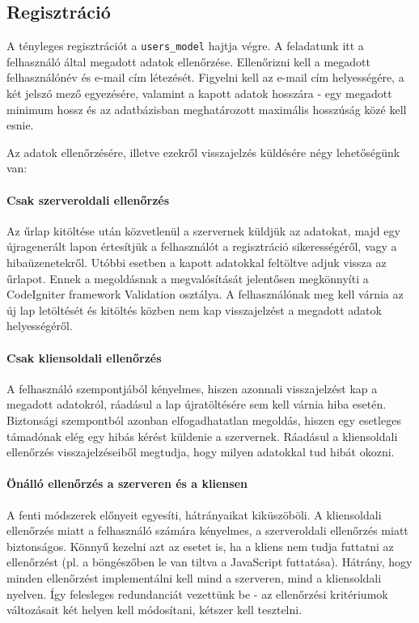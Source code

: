 \documentclass[12pt,a4paper,twoside]{article}
\begin{document}
\subsection{Regisztráció}
\label{sec:reg_check}

A tényleges regisztrációt a \texttt{users\_model} hajtja végre. A feladatunk itt
a felhasználó által megadott adatok ellenőrzése. Ellenőrizni
kell a megadott felhasználónév és e-mail cím létezését. Figyelni kell az e-mail
cím helyességére, a két jelszó mező egyezésére, valamint a kapott adatok
hosszára - egy megadott minimum hossz és az adatbázisban meghatározott
maximális hosszúság közé kell esnie.

Az adatok ellenőrzésére, illetve ezekről visszajelzés küldésére négy
lehetőségünk van:

\paragraph{Csak szerveroldali ellenőrzés}
Az űrlap kitöltése után közvetlenül a szervernek küldjük az adatokat, majd egy
újragenerált lapon értesítjük a felhasználót a regisztráció sikerességéről, vagy
a hibaüzenetekről. Utóbbi esetben a kapott adatokkal feltöltve adjuk vissza az
űrlapot. Ennek a megoldásnak a megvalósítását jelentősen megkönnyíti a
CodeIgniter framework Validation osztálya\cite{CI-Val}. A felhasználónak meg kell várnia az új lap
letöltését és kitöltés közben nem kap visszajelzést a megadott adatok
helyességéről.

\paragraph{Csak kliensoldali ellenőrzés}
A felhasználó szempontjából kényelmes, hiszen azonnali visszajelzést kap a
megadott adatokról, ráadásul a lap újratöltésére sem kell várnia hiba
esetén. Biztonsági szempontból azonban elfogadhatatlan megoldás, hiszen egy
esetleges támadónak elég egy hibás kérést küldenie a szervernek. Ráadásul a
kliensoldali ellenőrzés visszajelzéseiből megtudja, hogy milyen adatokkal tud
hibát okozni.

\paragraph{Önálló ellenőrzés a szerveren és a kliensen}
A fenti módszerek előnyeit egyesíti, hátrányaikat kiküszöböli. A kliensoldali
ellenőrzés miatt a felhasználó számára kényelmes, a szerveroldali ellenőrzés
miatt biztonságos. Könnyű kezelni azt az esetet is, ha a kliens nem tudja
futtatni az ellenőrzést (pl. a böngészőben le van tiltva a JavaScript
futtatása). Hátrány, hogy minden ellenőrzést implementálni kell mind
a szerveren, mind a kliensoldali nyelven. Így felesleges redundanciát vezettünk
be - az ellenőrzési kritériumok változásait két helyen kell módosítani, kétszer
kell tesztelni.
\end{document}
